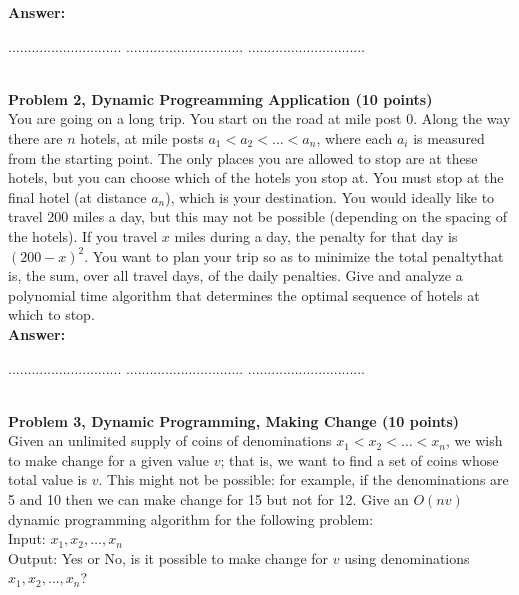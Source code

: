 \documentclass{article}
\begin{document}
\noindent
{\bf Answer:}





\pagebreak
{} $.............................$
 $..............................$
          $..............................$

\noindent
{}\\

\noindent
{\bf Problem 2, Dynamic Progreamming Application (10 points)}\\
You are going on a long trip. You start on the road at mile post 0. Along the way there are $n$
hotels, at mile posts $a_1 < a_2 < \ldots < a_n$, where each $a_i$ is measured from the starting point.
The only places you are allowed to stop are at these hotels, but you can choose which of the hotels
you stop at. You must stop at the final hotel (at distance $a_n$), which is your destination.
You would ideally like to travel 200 miles a day, but this may not be possible (depending on the spacing
of the hotels). If you travel $x$ miles during a day, the penalty for that day is $(200 - x)^2. $ 
You want to plan your trip so as to minimize the total penaltythat is, the sum, over all travel days, 
of the daily penalties.
Give and analyze a polynomial time algorithm that determines the optimal sequence of hotels at which to stop.\\


\noindent
{\bf Answer:}


\pagebreak
{} $.............................$
 $..............................$
          $..............................$

\noindent
{}\\

\noindent
{\bf Problem 3, Dynamic Programming, Making Change (10 points)}\\
Given an unlimited supply of coins of denominations $x_1 < x_2 <  \ldots < x_n$, 
we wish to make change for a given value $v$; 
that is, we want to find a set of coins whose total value is $v$. 
This might not be possible: for example, if the denominations are 5 and 10 
then we can make change for 15 but not for 12. 
Give an $O(nv)$ dynamic programming algorithm for the following problem:\\
Input: $x_1, x_2 , \ldots , x_n$\\
Output: Yes or No, is it possible to make change for $v$ using denominations $x_1, x_2, \ldots , x_n$?\\
\end{document}
